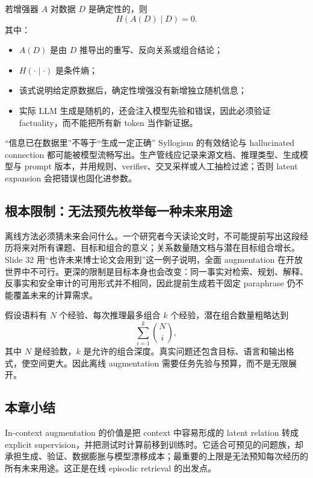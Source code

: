

若增强器 $A$ 对数据 $D$ 是确定性的，则
$$
H\!\left(A(D)\mid D\right)=0.
$$
其中：
\begin{itemize}
  \item $A(D)$ 是由 $D$ 推导出的重写、反向关系或组合结论；
  \item $H(\cdot\mid\cdot)$ 是条件熵；
  \item 该式说明给定原数据后，确定性增强没有新增独立随机信息；
  \item 实际 LLM 生成是随机的，还会注入模型先验和错误，因此必须验证 factuality，而不能把所有新 token 当作新证据。
\end{itemize}

\begin{warningbox}{“信息已在数据里”不等于“生成一定正确”}
Syllogism 的有效结论与 hallucinated connection 都可能被模型流畅写出。生产管线应记录来源文档、推理类型、生成模型与 prompt 版本，并用规则、verifier、交叉采样或人工抽检过滤；否则 latent expansion 会把错误也固化进参数。
\end{warningbox}

\subsection{根本限制：无法预先枚举每一种未来用途}

离线方法必须猜未来会问什么。一个研究者今天读论文时，不可能提前写出这段经历将来对所有课题、目标和组合的意义；关系数量随文档与潜在目标组合增长。Slide 32 用“也许未来博士论文会用到”这一例子说明，全面 augmentation 在开放世界中不可行。更深的限制是目标本身也会改变：同一事实对检索、规划、解释、反事实和安全审计的可用形式并不相同，因此提前生成若干固定 paraphrase 仍不能覆盖未来的计算需求。


假设语料有 $N$ 个经验、每次推理最多组合 $k$ 个经验，潜在组合数量粗略达到
$$
\sum_{i=1}^{k}\binom{N}{i},
$$
其中 $N$ 是经验数，$k$ 是允许的组合深度。真实问题还包含目标、语言和输出格式，使空间更大。因此离线 augmentation 需要任务先验与预算，而不是无限展开。

\subsection{本章小结}

In-context augmentation 的价值是把 context 中容易形成的 latent relation 转成 explicit supervision，并把测试时计算前移到训练时。它适合可预见的问题族，却承担生成、验证、数据膨胀与模型漂移成本；最重要的上限是无法预知每次经历的所有未来用途。这正是在线 episodic retrieval 的出发点。

